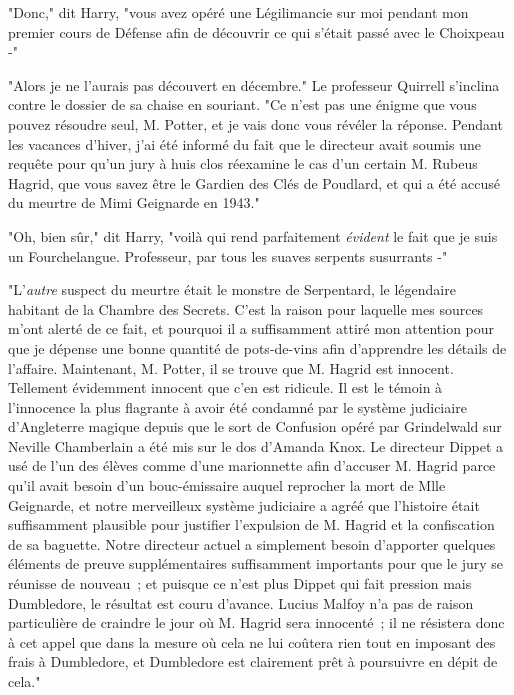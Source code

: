 "Donc," dit Harry, "vous avez opéré une Légilimancie sur moi pendant mon premier cours de Défense afin de découvrir ce qui s'était passé avec le Choixpeau -"

"Alors je ne l'aurais pas découvert en décembre." Le professeur Quirrell s'inclina contre le dossier de sa chaise en souriant. "Ce n'est pas une énigme que vous pouvez résoudre seul, M. Potter, et je vais donc vous révéler la réponse. Pendant les vacances d'hiver, j'ai été informé du fait que le directeur avait soumis une requête pour qu'un jury à huis clos réexamine le cas d'un certain M. Rubeus Hagrid, que vous savez être le Gardien des Clés de Poudlard, et qui a été accusé du meurtre de Mimi Geignarde en 1943."

"Oh, bien sûr," dit Harry, "voilà qui rend parfaitement \emph{évident} le fait que je suis un Fourchelangue. Professeur, par tous les suaves serpents susurrants -"

"L'\emph{autre} suspect du meurtre était le monstre de Serpentard, le légendaire habitant de la Chambre des Secrets. C'est la raison pour laquelle mes sources m'ont alerté de ce fait, et pourquoi il a suffisamment attiré mon attention pour que je dépense une bonne quantité de pots-de-vins afin d'apprendre les détails de l'affaire. Maintenant, M. Potter, il se trouve que M. Hagrid est innocent. Tellement évidemment innocent que c'en est ridicule. Il est le témoin à l'innocence la plus flagrante à avoir été condamné par le système judiciaire d'Angleterre magique depuis que le sort de Confusion opéré par Grindelwald sur Neville Chamberlain a été mis sur le dos d'Amanda Knox. Le directeur Dippet a usé de l'un des élèves comme d'une marionnette afin d'accuser M. Hagrid parce qu'il avait besoin d'un bouc-émissaire auquel reprocher la mort de Mlle Geignarde, et notre merveilleux système judiciaire a agréé que l'histoire était suffisamment plausible pour justifier l'expulsion de M. Hagrid et la confiscation de sa baguette. Notre directeur actuel a simplement besoin d'apporter quelques éléments de preuve supplémentaires suffisamment importants pour que le jury se réunisse de nouveau~; et puisque ce n'est plus Dippet qui fait pression mais Dumbledore, le résultat est couru d'avance. Lucius Malfoy n'a pas de raison particulière de craindre le jour où M. Hagrid sera innocenté~; il ne résistera donc à cet appel que dans la mesure où cela ne lui coûtera rien tout en imposant des frais à Dumbledore, et Dumbledore est clairement prêt à poursuivre en dépit de cela."

